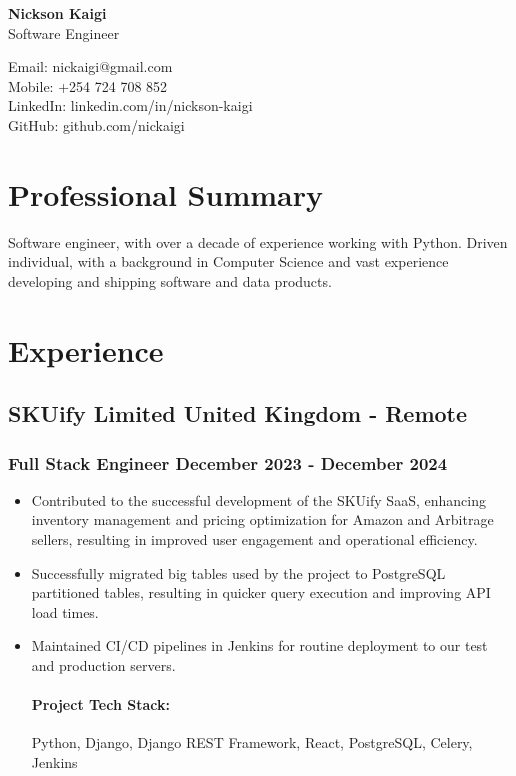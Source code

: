 \documentclass[11pt]{article} %
\begin{document}
\begin{center}
    \begin{minipage}{0.5\textwidth}
    {\Huge\bfseries
        Nickson Kaigi
        } \\ \medskip
        Software Engineer
    \end{minipage} \hfill
    \begin{minipage}{0.4\textwidth}
        \raggedleft
        Email: nickaigi@gmail.com \\
        Mobile: +254 724 708 852 \\
        LinkedIn: linkedin.com/in/nickson-kaigi \\
        GitHub: github.com/nickaigi
    \end{minipage}
\end{center}

\section{Professional Summary}
Software engineer, with over a decade of experience working with Python. Driven individual, with a background in Computer Science and vast experience developing and shipping software and data products.

\section{Experience}
\subsection{SKUify Limited \hfill United Kingdom - Remote}
\subsubsection{Full Stack Engineer \hfill  December 2023 - December 2024}
\begin{itemize}
    \item Contributed to the successful development of the SKUify SaaS, enhancing inventory management and pricing optimization for Amazon and Arbitrage sellers, resulting in improved user engagement and operational efficiency.
    \item Successfully migrated big tables used by the project to PostgreSQL partitioned tables, resulting in quicker query execution and improving API load times.
    \item Maintained CI/CD pipelines in Jenkins for routine deployment to our test and production servers.

    \paragraph{Project Tech Stack:} Python, Django, Django REST Framework, React, PostgreSQL, Celery, Jenkins
\end{itemize}
\end{document}
